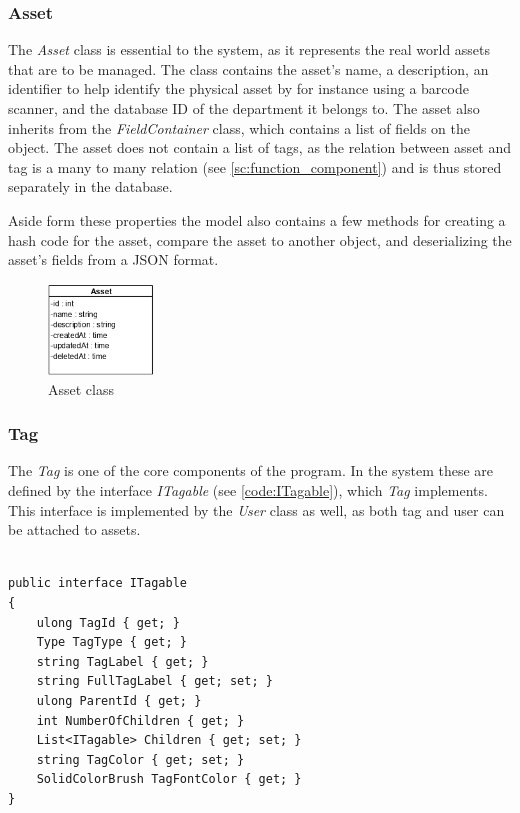 \subsubsection{Asset}\label{sssc:asset}
The \textit{Asset} class is essential to the system, as it represents the real world assets that are to be managed. The class contains the asset's name, a description, an identifier to help identify the physical asset by for instance using a barcode scanner, and the database ID of the department it belongs to. The asset also inherits from the \textit{FieldContainer} class, which contains a list of fields on the object. The asset does not contain a list of tags, as the relation between asset and tag is a many to many relation (see \autoref{sc:function_component}) and is thus stored separately in the database. 
\par
Aside form these properties the model also contains a few methods for creating a hash code for the asset, compare the asset to another object, and deserializing the asset's fields from a JSON format. 

\begin{figure}[H]
    \centering
    \includegraphics[width=0.25\textwidth]{figures/Classes/AssetAttributes.png}
    \caption{Asset class}
    \label{fig:AssetClass}
\end{figure}

\subsubsection{Tag}\label{sssc:tag}
The \textit{Tag} is one of the core components of the program. In the system these are defined by the interface \textit{ITagable} (see \autoref{code:ITagable}), which \textit{Tag} implements. This interface is implemented by the \textit{User} class as well, as both tag and user can be attached to assets. 
\par

\begin{listing}[H]
\begin{verbatim}

public interface ITagable
{
    ulong TagId { get; }
    Type TagType { get; }
    string TagLabel { get; }
    string FullTagLabel { get; set; }
    ulong ParentId { get; }
    int NumberOfChildren { get; }
    List<ITagable> Children { get; set; }
    string TagColor { get; set; }
    SolidColorBrush TagFontColor { get; }
}

\end{verbatim}
\label{code:ITagable}
\end{listing}

